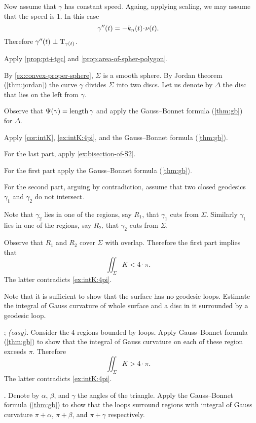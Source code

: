 Now assume that $\gamma$ has constant speed.
Againg, applying scaling, we may assume that the speed is 1.
In this case 
\[\gamma''(t)=-k_n(t)\cdot \Norm(t).\]
Therefore $\gamma''(t)\perp\mathrm{T}_{\gamma(t)}$.

Apply \ref{prop:pt+tgc} and \ref{prop:area-of-spher-polygon}.

By \ref{ex:convex-proper-sphere}, $\Sigma$ is a smooth sphere.
By Jordan theorem (\ref{thm:jordan}) the curve $\gamma$ divides $\Sigma$  into two discs.
Let us denote by $\Delta$ the disc that lies on the left from $\gamma$.

Observe that $\Psi({\gamma})=\mathop{\rm length}\nolimits\gamma$ and apply  the Gauss--Bonnet formula (\ref{thm:gb}) for $\Delta$.

Apply \ref{cor:intK}, \ref{ex:intK:4pi}, and the Gauss--Bonnet formula (\ref{thm:gb}).

For the last part, apply \ref{ex:bisection-of-S2}.

 For the first part apply the Gauss--Bonnet formula (\ref{thm:gb}).

For the second part, arguing by contradiction, assume that two closed geodesics $\gamma_1$ and $\gamma_2$ do not intersect.

Note that $\gamma_2$ lies in one of the regions, say $R_1$, that $\gamma_1$ cuts  from $\Sigma$.
Similarly $\gamma_1$ lies in one of the regions, say $R_2$, that $\gamma_2$ cuts  from $\Sigma$.

Observe that $R_1$ and $R_2$ cover $\Sigma$ with overlap.
Therefore the first part implies that 
\[\iint_\Sigma K< 4\cdot\pi.\]
The latter contradicts \ref{ex:intK:4pi}.

 Note that it is sufficient to show that the surface has no geodesic loops.
Estimate the integral of Gauss curvature of whole surface and a disc in it surrounded by a geodesic loop.

\parbf{\ref{ex:self-intersections}}; \textit{(easy)}.
Consider the 4 regions bounded by loops.
Apply Gauss--Bonnet formula (\ref{thm:gb}) to show that the integral of Gauss curvature on each of these region exceeds $\pi$.
Therefore 
\[\iint_\Sigma K>4\cdot\pi.\]
The latter contradicts \ref{ex:intK:4pi}.

.
Denote by $\alpha$, $\beta$, and $\gamma$ the angles of the triangle.
Apply the Gauss--Bonnet formula (\ref{thm:gb}) to show that the loops surround regions with integral of Gauss curvature $\pi+\alpha$, $\pi+\beta$, and $\pi+\gamma$ respectively.

